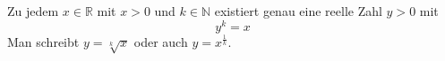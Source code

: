 Zu jedem $x \in \mathbb{R}$ mit $x > 0$ und $k \in \mathbb{N}$ existiert genau eine reelle Zahl $y > 0$ mit
$$y^k = x$$
Man schreibt $y = \sqrt[k]{x}$ oder auch $y = x^{\frac{1}{k}}$.